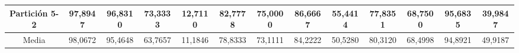 \documentclass[12pt]{article}
\begin{document}
\begin{table}[H]
{\begin{tabular}{|c|cccc|cccc|cccc|}
Partición 5-2 & \multicolumn{1}{c|}{97,8947}                                                  & \multicolumn{1}{c|}{96,8310}                                                 & \multicolumn{1}{c|}{73,3333} & 12,7110 & \multicolumn{1}{c|}{82,7778}                                                  & \multicolumn{1}{c|}{75,0000}                                                 & \multicolumn{1}{c|}{86,6667} & 55,4414 & \multicolumn{1}{c|}{77,8351}                                                  & \multicolumn{1}{c|}{68,7500}                                                 & \multicolumn{1}{c|}{95,6835} & 39,9847 \\ \hline
Media         & \multicolumn{1}{c|}{98,0672}                                                  & \multicolumn{1}{c|}{95,4648}                                                 & \multicolumn{1}{c|}{63,7657} & 11,1846 & \multicolumn{1}{c|}{78,8333}                                                  & \multicolumn{1}{c|}{73,1111}                                                 & \multicolumn{1}{c|}{84,2222} & 50,5280 & \multicolumn{1}{c|}{80,3120}                                                  & \multicolumn{1}{c|}{68,4998}                                                 & \multicolumn{1}{c|}{94,8921} & 49,9187 \\ \hline
\end{tabular}}
\end{table}
\end{document}
